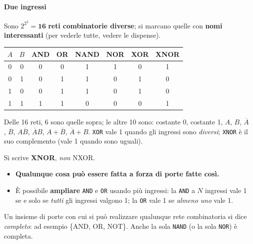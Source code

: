 \documentclass[11pt,a4paper]{article}
\begin{document}
\paragraph*{Due ingressi}

Sono $2^{2^2}=\mathbf{16}$ \textbf{reti combinatorie diverse}; si marcano quelle con \textbf{nomi interessanti} (per vederle tutte, vedere le dispense).

\begin{center}
\begin{tabular}{c c | c c c c c c}
$A$ & $B$ & AND & OR & NAND & NOR & XOR & XNOR \\ \hline
0 & 0 & 0 & 0 & 1 & 1 & 0 & 1 \\
0 & 1 & 0 & 1 & 1 & 0 & 1 & 0 \\
1 & 0 & 0 & 1 & 1 & 0 & 1 & 0 \\
1 & 1 & 1 & 1 & 0 & 0 & 0 & 1 \\
\end{tabular}
\end{center}

\begin{integrazione}
Delle 16 reti, 6 sono quelle sopra; le altre 10 sono: costante 0, costante 1, $A$, $B$, $\overline{A}$, $\overline{B}$, $A\overline{B}$, $\overline{A}B$, $A+\overline{B}$, $\overline{A}+B$. \texttt{XOR} vale 1 quando gli ingressi sono \emph{diversi}; \texttt{XNOR} è il suo complemento (vale 1 quando sono uguali).
\end{integrazione}

\begin{nota}
Si scrive \textbf{XNOR}, \emph{non} NXOR.
\end{nota}

\begin{itemize}[leftmargin=*]
  \item \textbf{Qualunque cosa può essere fatta a forza di porte fatte così.}
  \item È possibile \textbf{ampliare} \texttt{AND} e \texttt{OR} usando più ingressi: la \texttt{AND} a $N$ ingressi vale 1 se e solo se \emph{tutti} gli ingressi valgono 1; la \texttt{OR} vale 1 se \emph{almeno uno} vale 1.
\end{itemize}

\begin{integrazione}
Un insieme di porte con cui si può realizzare qualunque rete combinatoria si dice \emph{completo}: ad esempio \{AND, OR, NOT\}. Anche la sola \texttt{NAND} (o la sola \texttt{NOR}) è completa.
\end{integrazione}
\end{document}
